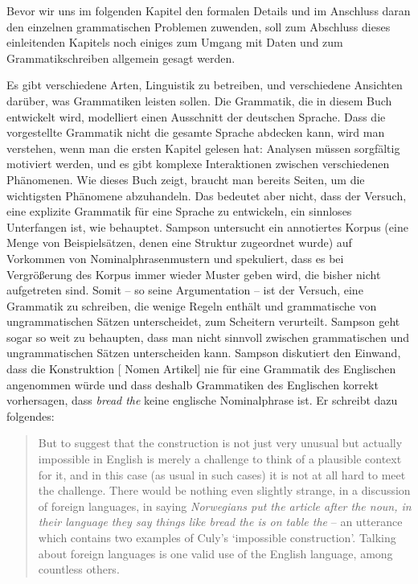 Bevor wir uns im folgenden Kapitel den formalen Details und im Anschluss daran den einzelnen
grammatischen Problemen zuwenden, soll zum Abschluss dieses einleitenden Kapitels noch einiges zum
Umgang mit Daten und zum Grammatikschreiben allgemein gesagt werden.

Es gibt verschiedene Arten, Linguistik zu betreiben, und verschiedene Ansichten darüber,
was Grammatiken leisten sollen. Die Grammatik, die in diesem Buch entwickelt wird,
modelliert einen Ausschnitt der deutschen Sprache. Dass die vorgestellte Grammatik nicht die gesamte
Sprache abdecken kann, wird man verstehen, wenn man die ersten Kapitel gelesen hat:
Analysen müssen sorgfältig motiviert werden, und es gibt komplexe Interaktionen
zwischen verschiedenen Phänomenen. Wie dieses Buch zeigt, braucht man bereits \pageref{last-page-hpsg-teil} Seiten,
um die wichtigsten Phänomene abzuhandeln. Das bedeutet aber nicht, dass der Versuch, eine explizite
Grammatik für eine Sprache zu entwickeln, ein sinnloses Unterfangen ist, wie \zb 
\citet[Kapitel~10]{Sampson2001a-u} behauptet. Sampson untersucht ein annotiertes
Korpus (eine Menge von Beispielsätzen, denen eine Struktur zugeordnet wurde)
auf Vorkommen von Nominalphrasenmustern und spekuliert, dass es bei Vergrößerung des Korpus
immer wieder Muster geben wird, die bisher nicht aufgetreten sind. Somit -- so seine Argumentation --
ist der Versuch, eine Grammatik zu schreiben, die wenige Regeln enthält und grammatische
von ungrammatischen Sätzen unterscheidet, zum Scheitern verurteilt.
Sampson geht sogar so weit zu behaupten, dass man nicht sinnvoll zwischen grammatischen und
ungrammatischen Sätzen unterscheiden kann. Sampson diskutiert den Einwand, dass die Konstruktion
[ Nomen Artikel] nie für eine Grammatik des Englischen angenommen würde und dass deshalb
Grammatiken des Englischen korrekt vorhersagen, dass \emph{bread the} keine englische Nominalphrase ist.
Er schreibt dazu folgendes:
\begin{quote}
But to suggest that the construction is not just very unusual but actually impossible in English
is merely a challenge to think of a plausible context for it, and in this case (as usual in such cases)
it is not at all hard to meet the challenge. There would be nothing even slightly strange, in a discussion
of foreign languages, in saying \emph{Norwegians put the article after the noun, in their language
they say things like bread the is on table the} -- an utterance which contains two examples
of Culy's `impossible construction'. Talking about foreign languages is one valid use of the English
language, among countless others. \citep[]{Sampson2001a-u}
\end{quote}
